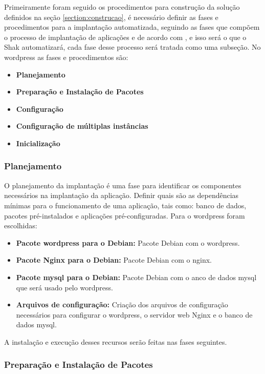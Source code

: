 Primeiramente foram seguido os procedimentos para construção da solução definidos na seção \ref{section:construcao}, é
necessário definir as fases e procedimentos para a implantação automatizada,
seguindo as fases que compõem o processo de implantação de aplicações e de acordo
com \cite{omg2006}, e isso será o que o Shak automatizará, cada fase desse processo
 será tratada como uma subseção. No wordpress as fases e procedimentos são:

\begin{itemize}
  \item  \textbf{Planejamento}
  \item  \textbf{Preparação e Instalação de Pacotes}
  \item  \textbf{Configuração}
  \item  \textbf{Configuração de múltiplas instâncias}
  \item  \textbf{Inicialização}
\end{itemize}


\subsubsection{Planejamento}

O planejamento da implantação é uma fase para identificar os componentes
necessários na implantação da aplicação. Definir quais são as dependências mínimas
para o funcionamento de uma aplicação, tais como: banco de dados, pacotes
pré-instalados e aplicações pré-configuradas. Para o wordpress foram escolhidas:

\begin{itemize}
   \item \textbf{Pacote wordpress para o Debian:} Pacote Debian com o wordpress.
   \item \textbf{Pacote Nginx para o Debian:} Pacote Debian com o nginx.
   \item \textbf{Pacote mysql para o Debian:} Pacote Debian com o anco de dados mysql
   que será usado pelo wordpress.
   \item \textbf{Arquivos de configuração:} Criação dos arquivos de configuração
   necessários para configurar o wordpress, o servidor web Nginx e o banco de dados
   mysql.
\end{itemize}

A instalação e execução desses recursos serão feitas nas fases seguintes.

\subsubsection{Preparação e Instalação de Pacotes}
\label{wordpress:preparacao}

